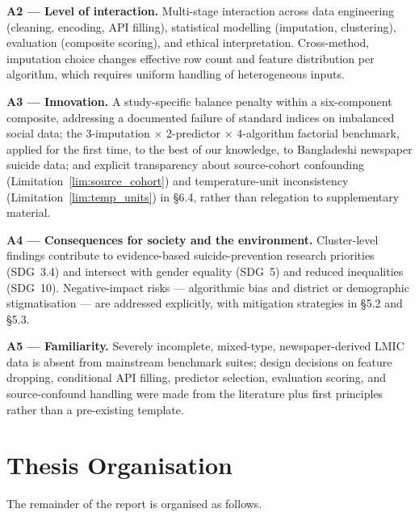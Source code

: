 \textbf{A2 --- Level of interaction.} Multi-stage interaction across data engineering (cleaning, encoding, API filling), statistical modelling (imputation, clustering), evaluation (composite scoring), and ethical interpretation. Cross-method, imputation choice changes effective row count and feature distribution per algorithm, which requires uniform handling of heterogeneous inputs.

\textbf{A3 --- Innovation.} A study-specific balance penalty within a six-component composite, addressing a documented failure of standard indices on imbalanced social data; the 3-imputation $\times$ 2-predictor $\times$ 4-algorithm factorial benchmark, applied for the first time, to the best of our knowledge, to Bangladeshi newspaper suicide data; and explicit transparency about source-cohort confounding (Limitation~\ref{lim:source_cohort}) and temperature-unit inconsistency (Limitation~\ref{lim:temp_units}) in \S6.4, rather than relegation to supplementary material.

\textbf{A4 --- Consequences for society and the environment.} Cluster-level findings contribute to evidence-based suicide-prevention research priorities (SDG~3.4) and intersect with gender equality (SDG~5) and reduced inequalities (SDG~10). Negative-impact risks --- algorithmic bias and district or demographic stigmatisation --- are addressed explicitly, with mitigation strategies in \S5.2 and \S5.3.

\textbf{A5 --- Familiarity.} Severely incomplete, mixed-type, newspaper-derived LMIC data is absent from mainstream benchmark suites; design decisions on feature dropping, conditional API filling, predictor selection, evaluation scoring, and source-confound handling were made from the literature plus first principles rather than a pre-existing template.

\section{Thesis Organisation}

The remainder of the report is organised as follows.

